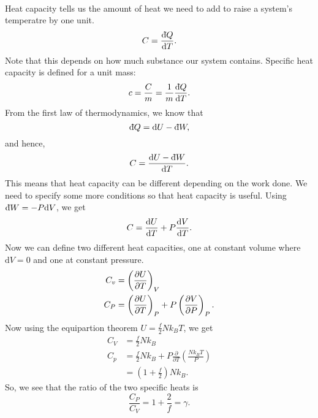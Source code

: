 \documentclass[../thermodynamics.tex]{subfiles}
\begin{document}
        \paragraph{}
        Heat capacity tells us the amount of heat we need to add to raise a system's temperatre by one unit.
        \begin{equation}
            C=\frac{\dbar{Q}}{\mathrm{d}T}.
        \end{equation}
        Note that this depends on how much substance our system contains.
        Specific heat capacity is defined for a unit mass:
        \begin{equation}
            c=\frac{C}{m}=\frac{1}{m}\frac{\dbar{Q}}{\mathrm{d}T}.
        \end{equation}
        From the first law of thermodynamics, we know that
        \begin{equation}
            \dbar{Q}=\mathrm{d}U-\dbar{W},
        \end{equation}
        and hence,
        \begin{equation}
            C=\frac{\mathrm{d}U-\dbar{W}}{\mathrm{d}T}.
        \end{equation}
        This means that heat capacity can be different depending on the work done.
        We need to specify some more conditions so that heat capacity is useful.
        Using $\dbar{W}=-P\mathrm{d}V$, we get
        \begin{equation}
            C=\dv{U}{T}+P\dv{V}{T}.
        \end{equation}
        Now we can define two different heat capacities, one at constant volume where $\mathrm{d}V=0$ and one at constant pressure.
        \begin{align}
            C_v&=\left(\pdv{U}{T}\right)_V\\
            C_P&=\left(\pdv{U}{T}\right)_P+P\left(\pdv{V}{P}\right)_P.
        \end{align}
        Now using the equipartion theorem $U=\frac{f}{2}Nk_BT$, we get
        \begin{align}
            C_V&=\frac{f}{2}Nk_B\\
            C_p&=\frac{f}{2}Nk_B+P\frac{\partial}{\partial T}\left(\frac{Nk_BT}{P}\right)\\
            &=\left(1+\frac{f}{2}\right)Nk_B.
        \end{align}
        So, we see that the ratio of the two specific heats is
        \begin{equation}
            \frac{C_P}{C_V}=1+\frac{2}{f}=\gamma.
        \end{equation}
\end{document}

